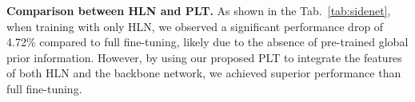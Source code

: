 \textbf{Comparison between HLN and PLT.} As shown in the Tab.~\ref{tab:sidenet}, when training with only HLN, we observed a significant performance drop of 4.72\% compared to full fine-tuning, likely due to the absence of pre-trained global prior information. However, by using our proposed PLT to integrate the features of both HLN and the backbone network, we achieved superior performance than full fine-tuning.

